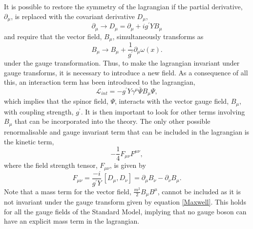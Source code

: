 It is possible to restore the symmetry of the lagrangian if the partial derivative, $\partial_{\mu}$, is replaced with the covariant derivative $D_{\mu}$,
\begin{equation}
\partial_{\mu} \rightarrow D_{\mu} = \partial_{\mu} + ig^{\prime}YB_{\mu}
\end{equation}
and require that the vector field, $B_{\mu}$, simultaneously transforms as
\begin{equation}\label{Maxwell}
B_{\mu} \rightarrow B_{\mu} + \frac{1}{g^{\prime}} \partial_{\mu} \omega(x) .
\end{equation}
under the gauge transformation.
Thus, to make the lagrangian invariant under gauge transforms, it is necessary to introduce a new field. As a consequence of all this, an interaction term has been introduced to the lagrangian,
\begin{equation}
\mathcal{L}_{int} = -g^{\prime}Y\gamma^{\mu} \bar{\Psi} B_{\mu} \Psi ,
\end{equation}
which implies that the spinor field, $\Psi$, interacts with the vector gauge field, $B_{\mu}$, with coupling strength, $g^{\prime}$.
It is then important to look for other terms involving $B_{\mu}$ that can be incorporated into the theory. The only other possible renormalisable and gauge invariant term that can be included in the lagrangian is the kinetic term, 
\begin{equation}\label{kineticterm}
- \frac{1}{4} F_{\mu \nu}  F^{\mu \nu} , %
\end{equation}
where the field strength tensor, $F_{\mu \nu}$, is given by
\begin{equation}
F_{\mu \nu} = \frac{-i}{g^{\prime} Y} \, [D_{\mu},D_{\nu}] = \partial_{\mu} B_{\nu} - \partial_{\nu} B_{\mu} .
\end{equation}
Note that a mass term for the vector field, $\frac{m^2}{2} B_{\mu} B^{\mu}$, cannot be included as it is not invariant under the gauge transform given by equation \ref{Maxwell}. This holds for all the gauge fields of the Standard Model, implying that no gauge boson can have an explicit mass term in the lagrangian.
 
